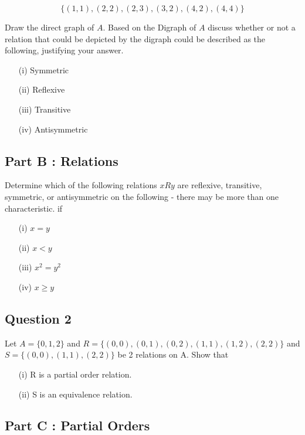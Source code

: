 \documentclass[]{report}
\begin{document}
\begin{enumerate}
\[ \{  (1,1),(2,2),(2,3),(3,2),(4,2),(4,4)\} \]

Draw the direct graph of $A$. Based on the Digraph of $A$ discuss whether or not a relation that could be depicted by the digraph could be described as the following, justifying your answer.


\begin{itemize}
\item[(i)] Symmetric
\item[(ii)] Reflexive 
\item[(iii)] Transitive
\item[(iv)] Antisymmetric
\end{itemize}
\subsection*{Part B : Relations}
Determine which of the following relations $ x R y$ are reflexive, transitive, symmetric, or antisymmetric on the following - there may be more than one characteristic.  if

\begin{itemize} 
\item[(i)] $x = y$
\item[(ii)] $x < y$
\item[(iii)] $x^2 = y^2$
\item[(iv)] $x \geq y$
\end{itemize}
\subsection*{Question 2}


Let $A=\{0,1,2\}$ and $R=\{ (0,0),(0,1),(0,2),(1,1), (1,2), (2,2)\}$
and $S=\{(0,0),(1,1),(2,2)\}$ be 2 relations on A. Show that

\begin{itemize}
\item[(i)] R is a partial order relation.
\item[(ii)] S is an equivalence relation.
\end{itemize}

\subsection*{Part C : Partial Orders}


\end{enumerate}
\end{document}
